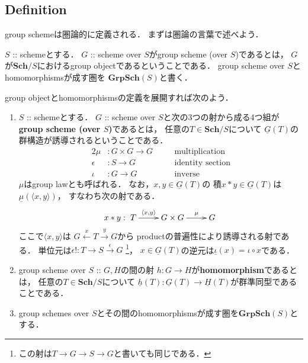 \documentclass[a4paper]{jsarticle}
\newcommand{\Sch}{\mathbf{Sch}}
\newcommand{\GrpSch}{\mathbf{GrpSch}}
\newcommand{\func}[1]{\underline{#1}}
\begin{document}
    \subsection{Definition}
    group schemeは圏論的に定義される．
    まずは圏論の言葉で述べよう．
    \begin{Def}
        $S$ :: schemeとする．
        $G$ :: scheme over $S$がgroup scheme (over $S$)であるとは，
        $G$が$\Sch/S$におけるgroup objectであるということである．
        group scheme over $S$とhomomorphismsが成す圏を
        $\GrpSch(S)$と書く．
    \end{Def}
    group objectとhomomorphismsの定義を展開すれば次のよう．
    \begin{Def}
    \enumfix
    \begin{enumerate}[label=(\roman*),leftmargin=*]
        \item
        $S$ :: schemeとする．
        $G$ :: scheme over $S$と次の3つの射から成る4つ組が
        \textbf{group scheme (over $S$)}であるとは，
        任意の$T \in \Sch/S$について
        $\func{G}(T)$の群構造が誘導されるということである．
        \begin{alignat*}{2}
            \mu&:       G \times G \to G    && \quad \text{multiplication} \\
            \epsilon&:  S \to G             && \quad \text{identity section}\\
            \iota&:     G \to G             && \quad \text{inverse}
        \end{alignat*}
        $\mu$はgroup lawとも呼ばれる．
        なお，$x, y \in \func{G}(T)$の
        積$x \ast y \in \func{G}(T)$は$\func{\mu}(\langle x, y \rangle)$，
        すなわち次の射である．
        \[
            x \ast y:
        \xymatrix
        {
            T \ar[r]^-{\langle x, y \rangle}& G \times G \ar[r]^-{\mu}& G
        }
        \]
        ここで$\langle x, y \rangle$は
        $G \xleftarrow{x} T \xrightarrow{y} G$から
        productの普遍性により誘導される射である．
        単位元は$\epsilon!: T \to S \xrightarrow{\epsilon} G$
        \footnote{ この射は$T \to G \to S \to G$と書いても同じである． }，
        $x \in \func{G}(T)$の逆元は$\func{\iota}(x)=\iota \circ x$である．

        \item
        group scheme over $S$ :: $G,H$の間の射
        $h: G \to H$が\textbf{homomorphism}であるとは，
        任意の$T \in \Sch/S$について
        $\func{h}(T):\func{G}(T) \to \func{H}(T)$が群準同型であることである．

        \item 
            group schemes over $S$とその間のhomomorphismsが成す圏を\textbf{$\GrpSch(S)$}とする．
    \end{enumerate}
    \end{Def}
\end{document}
